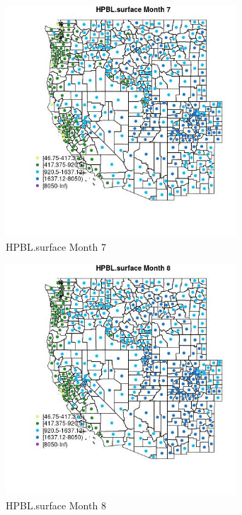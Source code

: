 \begin{figure} 
\centering  
\includegraphics[width=0.77\textwidth]{Code_Outputs/df_report_ML_predictors_CountyCentroid_Locations_Dates_2008-01-01to2018-12-31_MapObsMo7HPBLsurface.jpg} 
\caption{\label{fig:df_report_ML_predictors_CountyCentroid_Locations_Dates_2008-01-01to2018-12-31MapObsMo7HPBLsurface}HPBL.surface Month 7} 
\end{figure} 
 

\clearpage 

\begin{figure} 
\centering  
\includegraphics[width=0.77\textwidth]{Code_Outputs/df_report_ML_predictors_CountyCentroid_Locations_Dates_2008-01-01to2018-12-31_MapObsMo8HPBLsurface.jpg} 
\caption{\label{fig:df_report_ML_predictors_CountyCentroid_Locations_Dates_2008-01-01to2018-12-31MapObsMo8HPBLsurface}HPBL.surface Month 8} 
\end{figure} 
 

